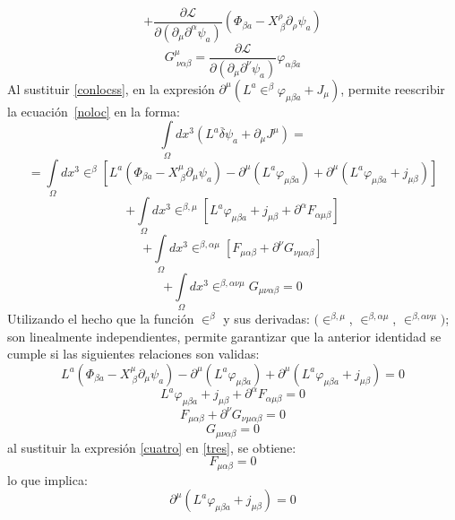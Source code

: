 \documentclass[a4paper,12pt]{article}
\begin{document}
$$+\frac{\partial\mathscr{L} }{\partial(\partial_{\mu}\partial^{\alpha} \psi_a)}(\Phi_{\beta a}-X_{\ \beta}^\rho\partial_\rho\psi_a)$$
\begin{equation}
G^\mu_{\ \nu\alpha\beta}=\frac{\partial\mathscr{L} }{\partial(\partial_{\mu}\partial^{\nu} \psi_a)}\varphi_{\alpha\beta a}
\end{equation}
Al sustituir \eqref{conlocss}, en la expresión $\partial^\mu(L^a\in^{\beta}\varphi_{\mu\beta a}+J_\mu)$, permite reescribir la \mbox{ecuación \eqref{noloc}} en la forma: 
\begin{equation}
\int\limits_{\Omega}dx^{3}(L^a\overset{\_}{\delta}\psi_a+\partial_\mu J^\mu)=
\end{equation}
$$=\int\limits_{\Omega}dx^{3}\in^\beta\left[L^a(\Phi_{\beta a}-X_{\ \beta}^\mu\partial_\mu\psi_a)-\partial^\mu(L^a\varphi_{\mu\beta a})+\partial^\mu(L^a\varphi_{\mu\beta a}+j_{\mu\beta})\right]$$
$$+\int\limits_{\Omega}dx^{3}\in^{\beta,\mu}[L^a\varphi_{\mu\beta a}+j_{\mu\beta}+\partial^\alpha F_{\alpha\mu\beta}]$$
$$+\int\limits_{\Omega}dx^{3}\in^{\beta,\alpha\mu}[F_{\mu\alpha\beta}+\partial^\nu G_{\nu\mu\alpha\beta}]$$
$$+\int\limits_{\Omega}dx^{3}\in^{\beta,\alpha\nu\mu}G_{\mu\nu\alpha\beta}=0$$
Utilizando el hecho que la función $\in^\beta$ y sus derivadas: $(\in^{\beta,\mu}$, $\in^{\beta,\alpha\mu}$, $\in^{\beta,\alpha\nu\mu})$; son linealmente independientes, permite garantizar que la anterior identidad se cumple si las siguientes relaciones son validas:   
\begin{equation}
L^a(\Phi_{\beta a}-X_{\ \beta}^\mu\partial_\mu\psi_a)-\partial^\mu(L^a\varphi_{\mu\beta a})+\partial^\mu(L^a\varphi_{\mu\beta a}+j_{\mu\beta})=0 
\label{uno}
\end{equation}
\begin{equation}
L^a\varphi_{\mu\beta a}+j_{\mu\beta}+\partial^\alpha F_{\alpha\mu\beta}=0 
\label{dos}
\end{equation}
\begin{equation}
F_{\mu\alpha\beta}+\partial^\nu G_{\nu\mu\alpha\beta}=0
\label{tres}
\end{equation}
\begin{equation}
G_{\mu\nu\alpha\beta}=0
\label{cuatro}
\end{equation}
al sustituir la expresión \eqref{cuatro} en \eqref{tres}, se obtiene:
\begin{equation}
F_{\mu\alpha\beta}=0
\end{equation}
lo que implica: 
\begin{equation}
\partial^\mu(L^a\varphi_{\mu\beta a}+j_{\mu\beta})=0
\end{equation}
\end{document}
